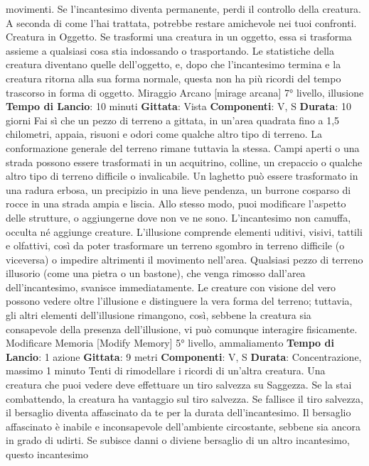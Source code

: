 \begin{multicols}{2}
movimenti.
Se l’incantesimo diventa permanente, perdi il controllo
della creatura. A seconda di come l’hai trattata,
potrebbe restare amichevole nei tuoi confronti.
Creatura in Oggetto. Se trasformi una creatura in un
oggetto, essa si trasforma assieme a qualsiasi cosa stia
indossando o trasportando. Le statistiche della creatura
diventano quelle dell’oggetto, e, dopo che l’incantesimo
termina e la creatura ritorna alla sua forma normale,
questa non ha più ricordi del tempo trascorso in forma
di oggetto.
Miraggio Arcano
[mirage arcana]
7° livello, illusione
\textbf{Tempo di Lancio}: 10 minuti
\textbf{Gittata}: Vista
\textbf{Componenti}: V, S
\textbf{Durata}: 10 giorni
Fai sì che un pezzo di terreno a gittata, in un’area
quadrata fino a 1,5 chilometri, appaia, risuoni e odori
come qualche altro tipo di terreno. La conformazione
generale del terreno rimane tuttavia la stessa. Campi
aperti o una strada possono essere trasformati in un
acquitrino, colline, un crepaccio o qualche altro tipo di
terreno difficile o invalicabile. Un laghetto può essere
trasformato in una radura erbosa, un precipizio in una
lieve pendenza, un burrone cosparso di rocce in una
strada ampia e liscia.
Allo stesso modo, puoi modificare l’aspetto delle
strutture, o aggiungerne dove non ve ne sono.
L’incantesimo non camuffa, occulta né aggiunge
creature.
L’illusione comprende elementi uditivi, visivi, tattili e
olfattivi, così da poter trasformare un terreno sgombro
in terreno difficile (o viceversa) o impedire altrimenti il
movimento nell’area. Qualsiasi pezzo di terreno illusorio
(come una pietra o un bastone), che venga rimosso
dall’area dell’incantesimo, svanisce immediatamente.
Le creature con visione del vero possono vedere oltre
l’illusione e distinguere la vera forma del terreno;
tuttavia, gli altri elementi dell’illusione rimangono, così,
sebbene la creatura sia consapevole della presenza
dell’illusione, vi può comunque interagire fisicamente.
Modificare Memoria
[Modify Memory]
5° livello, ammaliamento
\textbf{Tempo di Lancio}: 1 azione
\textbf{Gittata}: 9 metri
\textbf{Componenti}: V, S
\textbf{Durata}: Concentrazione, massimo 1 minuto
Tenti di rimodellare i ricordi di un’altra creatura. Una
creatura che puoi vedere deve effettuare un tiro
salvezza su Saggezza. Se la stai combattendo, la
creatura ha vantaggio sul tiro salvezza. Se fallisce il tiro
salvezza, il bersaglio diventa affascinato da te per la
durata dell’incantesimo. Il bersaglio affascinato è inabile
e inconsapevole dell’ambiente circostante, sebbene sia
ancora in grado di udirti. Se subisce danni o diviene
bersaglio di un altro incantesimo, questo incantesimo 

\end{multicols}
